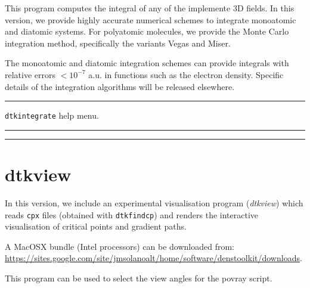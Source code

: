 This program computes the integral of any of the implemente 3D fields. In this version,
we provide highly accurate numerical schemes to integrate monoatomic and diatomic systems.
For polyatomic molecules, we provide the Monte Carlo integration method, specifically the
variants Vegas and Miser.

The monoatomic and diatomic integration schemes can provide integrals with relative errors
$< 10^{-7}$ a.u. in functions such as the electron density. Specific details of the
integration algorithms will be released elsewhere.

\rule{\textwidth}{1pt}
{\center\texttt{dtkintegrate} help menu.\\}
\rule{\textwidth}{1pt}
\begin{footnotesize}
\end{footnotesize}
\rule{\textwidth}{1pt}

\section{\label{sec:dtkview}dtkview}

In this version, we include an experimental visualisation program (\textit{dtkview}) which
reads \texttt{cpx} files (obtained with \texttt{dtkfindcp}) and renders
the interactive visualisation of critical points and gradient paths.

A MacOSX bundle (Intel\textregistered{} processors) can be downloaded from:\\
\url{https://sites.google.com/site/jmsolanoalt/home/software/denstoolkit/downloads}.

This program can be used to select the view angles for the povray script.

